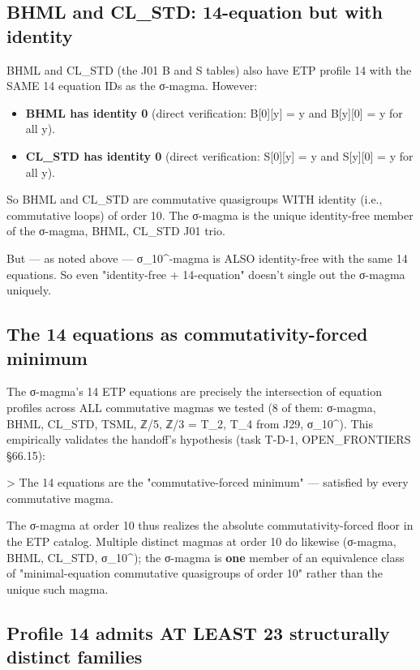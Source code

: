 \documentclass[11pt,reqno]{amsart}
\theoremstyle{plain}
\theoremstyle{definition}
\begin{document}
\subsection{BHML and CL_STD: 14-equation but with identity}

BHML and CL_STD (the J01 B and S tables) also have ETP profile 14 with the SAME 14 equation IDs as the σ-magma. However:

\begin{itemize}
\item \textbf{BHML has identity 0} (direct verification: B[0][y] = y and B[y][0] = y for all y).
\item \textbf{CL_STD has identity 0} (direct verification: S[0][y] = y and S[y][0] = y for all y).
\end{itemize}

So BHML and CL_STD are commutative quasigroups WITH identity (i.e., commutative loops) of order 10. The σ-magma is the unique identity-free member of the {σ-magma, BHML, CL_STD} J01 trio.

But --- as noted above --- σ_{10}^{\min}-magma is ALSO identity-free with the same 14 equations. So even "identity-free + 14-equation" doesn't single out the σ-magma uniquely.

\subsection{The 14 equations as commutativity-forced minimum}

The σ-magma's 14 ETP equations are precisely the intersection of equation profiles across ALL commutative magmas we tested (8 of them: σ-magma, BHML, CL_STD, TSML, ℤ/5, ℤ/3 = T_2, T_4 from J29, σ_{10}^{\min}). This empirically validates the handoff's hypothesis (task T-D-1, OPEN_FRONTIERS §66.15):

> The 14 equations are the "commutative-forced minimum" --- satisfied by every commutative magma.

The σ-magma at order 10 thus realizes the absolute commutativity-forced floor in the ETP catalog. Multiple distinct magmas at order 10 do likewise (σ-magma, BHML, CL_STD, σ_{10}^{\min}); the σ-magma is \textbf{one} member of an equivalence class of "minimal-equation commutative quasigroups of order 10" rather than the unique such magma.

\subsection{Profile 14 admits AT LEAST 23 structurally distinct families}
\end{document}
